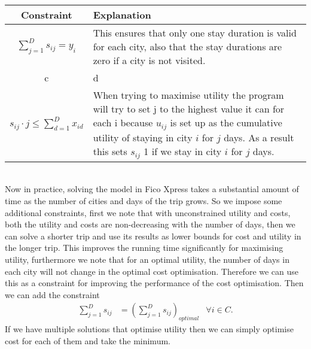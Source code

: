 \documentclass[12pt]{article}
\begin{document}
\begin{tabular}{c|p{11cm}}
\hline
Constraint &  Explanation \\
\hline
$\sum_{j=1}^{D} s_{ij} = y_{i}$ & This ensures that only one stay duration is valid for each city, also that the stay durations are zero if a city is not visited. \\
c & d \\
\hline
$s_{ij} \cdot j \leq \sum_{d=1}^{D} x_{id}$ & When trying to maximise utility the program will try to set j to the highest value it can for each i because $u_{ij}$ is set up as the cumulative utility of staying in city $i$ for $j$ days. As a result this sets $s_{ij}$ 1 if we stay in city $i$ for $j$ days. \\
\end{tabular}
\vspace{5mm}\\

Now in practice, solving the model in Fico Xpress takes a substantial amount of time as the number of cities and days of the trip grows. So we impose some additional constraints, first we note that with unconstrained utility and costs, both the utility and costs are non-decreasing with the number of days, then we can solve a shorter trip and use its results as lower bounds for cost and utility in the longer trip. This improves the running time significantly for maximising utility, furthermore we note that for an optimal utility, the number of days in each city will not change in the optimal cost optimisation. Therefore we can use this as a constraint for improving the performance of the cost optimisation. Then we can add the constraint
\begin{align*}
	\sum\limits_{j=1}^D s_{ij} &= (\sum\limits_{j=1}^D s_{ij})_{optimal} & \forall i \in C.
\end{align*}
If we have multiple solutions that optimise utility then we can simply optimise cost for each of them and take the minimum.
\pagebreak
\end{document}
